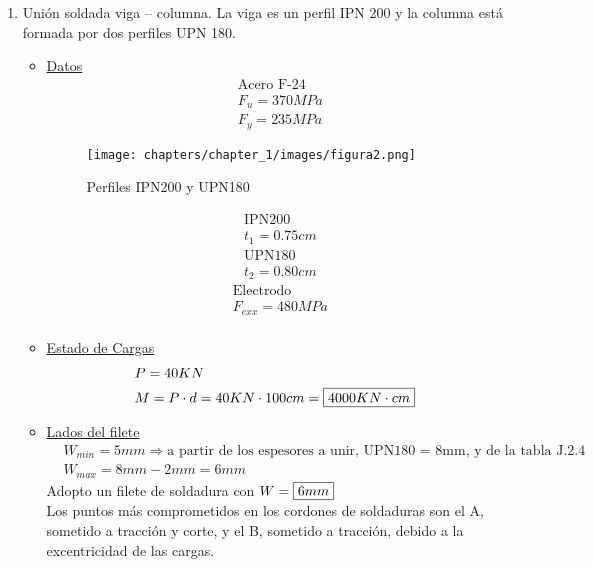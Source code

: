 \begin{enumerate}
\item Unión soldada viga – columna. La viga es un perfil IPN 200 y la columna está
formada por dos perfiles UPN 180.
\begin{itemize}
\item \underline{Datos}
\begin{align*}
& \text{Acero F-24}\\
& F_u = 370MPa\\
& F_y = 235MPa
\end{align*}

\begin{figure}[H]
\begin{center}
     \texttt{[image: chapters/chapter\_1/images/figura2.png]}
\end{center}
\caption{Perfiles IPN200 y UPN180}
\end{figure}

\begin{align*}
& \text{IPN200}\\
& t_1 = 0.75 cm
\end{align*}
\begin{align*}
& \text{UPN180}\\
& t_2 = 0.80 cm
\end{align*}
\begin{align*}
& \text{Electrodo}\\
& F_{exx} = 480MPa\\
\end{align*}

\item \underline{Estado de Cargas}
\begin{align*}
& P = 40KN \\
& M = P \cdot d = 40KN \cdot 100cm = \framebox{$4000 KN \cdot cm$}
\end{align*}

\item \underline{Lados del filete}
\begin{align*}
& W_{min} = 5mm \Rightarrow \text{a partir de los espesores a unir, UPN180 = 8mm, y de la tabla J.2.4}\\
& W_{max} = 8mm - 2mm = 6mm
\end{align*}
Adopto un filete de soldadura con $W = \framebox{$6 mm$}$\\
Los puntos más comprometidos en los cordones de soldaduras son el A, sometido a tracción y corte, y el B, sometido a tracción, debido a la excentricidad de las cargas.\\


\end{itemize}
\end{enumerate}
